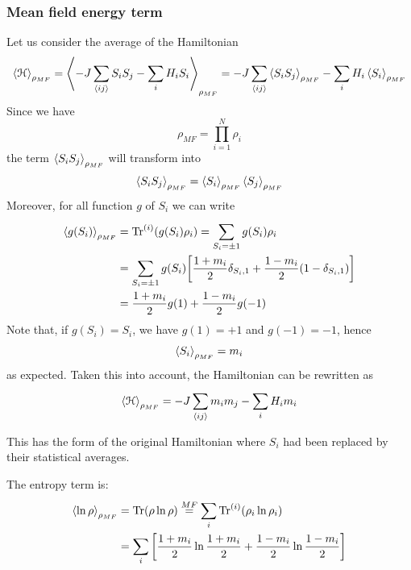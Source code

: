 \documentclass[../main/main.tex]{subfiles}
\begin{document}
\subsubsection{Mean field energy term}
Let us consider the average of the Hamiltonian
\begin{equation}
  \expval{\mathcal{H}}_{\rho _{MF}} = \expval{-J \sum_{\expval{ij} }^{} S_i S_j - \sum_{i}^{} H_i S_i   }_{\rho _{MF}}
  = - J   \sum_{\expval{ij} }^{} \expval{S_i S_j}_{\rho _{MF}} - \sum_{i}^{} H_i \expval{S_i}_{\rho _{MF}}
\end{equation}
Since we have
\begin{equation*}
  \rho _{MF} = \prod_{i=1}^{N} \rho _i
\end{equation*}
the term \( \expval{S_i S_j}_{\rho _{MF}}  \)  will transform into
\begin{equation*}
  \expval{S_i S_j}_{\rho _{MF}} = \expval{S_i}_{\rho _{MF}} \expval{S_j}_{\rho _{MF}}
\end{equation*}
Moreover, for all function \( g \) of \( S_i \) we can write
\begin{equation*}
\begin{split}
  \expval{g(S_i)}_{\rho _{MF}} &= \Tr^{(i)}(g(S_i)\rho _i) = \sum_{S_i = \pm 1}^{} g(S_i) \rho _i    \\
  &= \sum_{S_i = \pm 1}^{} g(S_i) \qty[\frac{1+m_i}{2} \delta _{S_i,1} + \frac{1-m_i}{2} (1- \delta _{S_i,1})  ] \\
  & = \frac{1+m_i}{2}g(1) + \frac{1-m_i}{2} g(-1)
\end{split}
\end{equation*}
Note that, if \( g(S_i) = S_i \), we have \( g(1) = +1\) and \( g(-1) = -1 \), hence
\begin{equation*}
  \expval{S_i}_{\rho _{MF}} = m_i
\end{equation*}
as expected. Taken this into account, the Hamiltonian can be rewritten as 
\begin{equation}
  \expval{\mathcal{H}}_{\rho _{MF}} = -J \sum_{\expval{ij} }^{} m_i m_j - \sum_{i}^{} H_i m_i
\end{equation}
\begin{remark}
This has the form of the original Hamiltonian where \( S_i \) had been replaced by their statistical averages.
\end{remark}
\noindent The entropy term is:
\begin{equation}
\begin{split}
  \expval{\ln{\rho } }_{\rho _{MF}} & = \Tr(\rho \ln{\rho } )  \overset{MF}{=} \sum_{i}^{} \Tr^{(i)} (\rho _i \ln{\rho _i} ) \\
 &  = \sum_{i}^{} \qty[ \frac{1+m_i}{2} \ln{\frac{1+m_i}{2}} + \frac{1-m_i}{2} \ln{\frac{1-m_i}{2}} ]
\end{split}
\end{equation}
\end{document}
